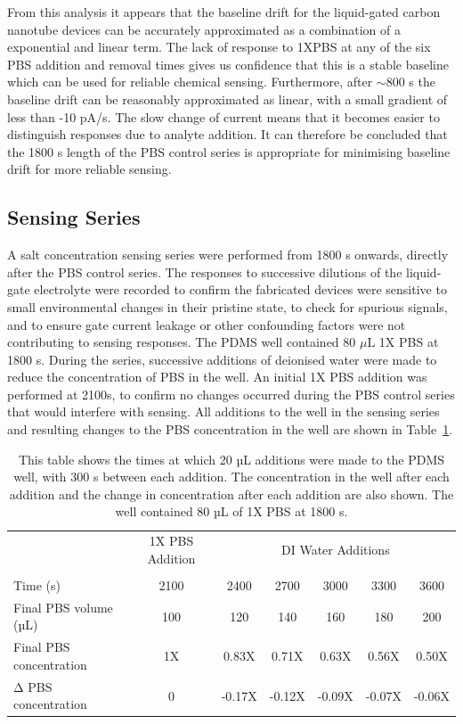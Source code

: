 \documentclass[
  a4paper,
]{scrbook}
\begin{document}
From this analysis it appears that the baseline drift for the
liquid-gated carbon nanotube devices can be accurately approximated as a
combination of a exponential and linear term. The lack of response to
1XPBS at any of the six PBS addition and removal times gives us
confidence that this is a stable baseline which can be used for reliable
chemical sensing. Furthermore, after \(\sim 800\) s the baseline drift
can be reasonably approximated as linear, with a small gradient of less
than -10 pA/s. The slow change of current means that it becomes easier
to distinguish responses due to analyte addition. It can therefore be
concluded that the 1800 s length of the PBS control series is
appropriate for minimising baseline drift for more reliable sensing.

\hypertarget{sec-salt-conc-series}{%
\subsection{Sensing Series}\label{sec-salt-conc-series}}

A salt concentration sensing series were performed from 1800 s onwards,
directly after the PBS control series. The responses to successive
dilutions of the liquid-gate electrolyte were recorded to confirm the
fabricated devices were sensitive to small environmental changes in
their pristine state, to check for spurious signals, and to ensure gate
current leakage or other confounding factors were not contributing to
sensing responses. The PDMS well contained 80 \(\mu\)L 1X PBS at 1800 s.
During the series, successive additions of deionised water were made to
reduce the concentration of PBS in the well. An initial 1X PBS addition
was performed at 2100s, to confirm no changes occurred during the PBS
control series that would interfere with sensing. All additions to the
well in the sensing series and resulting changes to the PBS
concentration in the well are shown in Table~\ref{tbl-salt-conc-series}.

\hypertarget{tbl-salt-conc-series}{}
\begin{longtable}[t]{lcccccc}
\caption{\label{tbl-salt-conc-series}This table shows the times at which 20 µL additions were made to the
PDMS well, with 300 s between each addition. The concentration in the
well after each addition and the change in concentration after each
addition are also shown. The well contained 80 µL of 1X PBS at 1800 s. }\tabularnewline

\toprule
\multicolumn{1}{c}{ } & \multicolumn{1}{c}{1X PBS Addition} & \multicolumn{5}{c}{DI Water Additions} \\
\cmidrule(l{3pt}r{3pt}){2-2} \cmidrule(l{3pt}r{3pt}){3-7}
 &  &  &  &  &  & \\
\midrule
Time (s) & 2100 & 2400 & 2700 & 3000 & 3300 & 3600\\
Final PBS volume (µL) & 100 & 120 & 140 & 160 & 180 & 200\\
Final PBS concentration & 1X & 0.83X & 0.71X & 0.63X & 0.56X & 0.50X\\
Δ PBS concentration & 0 & -0.17X & -0.12X & -0.09X & -0.07X & -0.06X\\
\bottomrule
\end{longtable}
\end{document}
